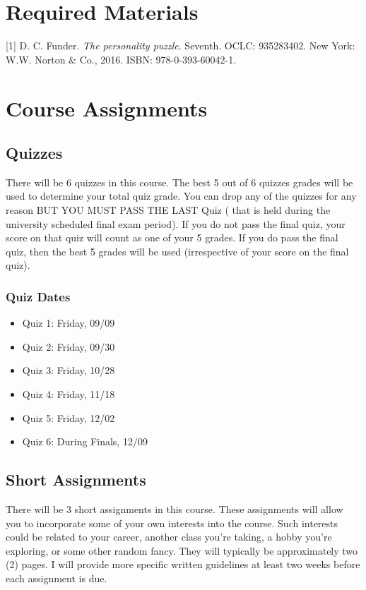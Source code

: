 \documentclass[
]{book}
\begin{document}
\section*{Required Materials}\label{required-materials-1}


{[}1{]} D. C. Funder. \emph{The personality puzzle}. Seventh. OCLC: 935283402.
New York: W.W. Norton \& Co., 2016. ISBN: 978-0-393-60042-1.

\section*{Course Assignments}\label{course-assignments-1}


\subsection*{Quizzes}\label{quizzes-1}


There will be 6 quizzes in this course. The best 5 out of 6 quizzes grades will be used to determine your total quiz grade. You can drop any of the quizzes for any reason BUT YOU MUST PASS THE LAST Quiz ( that is held during the university scheduled final exam period). If you do not pass the final quiz, your score on that quiz will count as one of your 5 grades. If you do pass the final quiz, then the best 5 grades will be used (irrespective of your score on the final quiz).

\subsubsection*{Quiz Dates}\label{quiz-dates}


\begin{itemize}
\item
  Quiz 1: Friday, 09/09
\item
  Quiz 2: Friday, 09/30
\item
  Quiz 3: Friday, 10/28
\item
  Quiz 4: Friday, 11/18
\item
  Quiz 5: Friday, 12/02
\item
  Quiz 6: During Finals, 12/09
\end{itemize}

\subsection*{Short Assignments}\label{short-assignments-1}


There will be 3 short assignments in this course. These assignments will allow you to incorporate some of your own interests into the course. Such interests could be related to your career, another class you're taking, a hobby you're exploring, or some other random fancy. They will typically be approximately two (2) pages. I will provide more specific written guidelines at least two weeks before each assignment is due.
\end{document}
